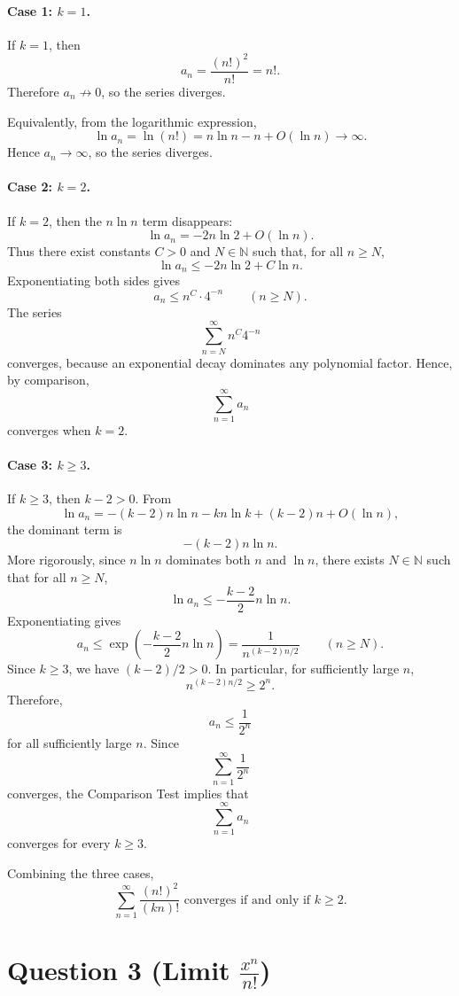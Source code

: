 \documentclass[12pt]{article}
\begin{document}
\paragraph{Case 1: \(k=1\).}
If \(k=1\), then
\[
a_n=\frac{(n!)^2}{n!}=n!.
\]
Therefore \(a_n\not\to0\), so the series diverges.

Equivalently, from the logarithmic expression,
\[
\ln a_n
=
\ln(n!)
=
n\ln n-n+O(\ln n)\to\infty.
\]
Hence \(a_n\to\infty\), so the series diverges.

\paragraph{Case 2: \(k=2\).}
If \(k=2\), then the \(n\ln n\) term disappears:
\[
\ln a_n
=
-2n\ln 2
+
O(\ln n).
\]
Thus there exist constants \(C>0\) and \(N\in\mathbb{N}\) such that, for all \(n\ge N\),
\[
\ln a_n
\le
-2n\ln2+C\ln n.
\]
Exponentiating both sides gives
\[
a_n
\le
n^C\cdot 4^{-n}
\qquad (n\ge N).
\]
The series
\[
\sum_{n=N}^{\infty} n^C4^{-n}
\]
converges, because an exponential decay dominates any polynomial factor. Hence, by comparison,
\[
\sum_{n=1}^{\infty}a_n
\]
converges when \(k=2\).

\paragraph{Case 3: \(k\ge 3\).}
If \(k\ge 3\), then \(k-2>0\). From
\[
\ln a_n
=
-(k-2)n\ln n
-
kn\ln k
+
(k-2)n
+
O(\ln n),
\]
the dominant term is
\[
-(k-2)n\ln n.
\]
More rigorously, since \(n\ln n\) dominates both \(n\) and \(\ln n\), there exists \(N\in\mathbb{N}\) such that for all \(n\ge N\),
\[
\ln a_n
\le
-\frac{k-2}{2}n\ln n.
\]
Exponentiating gives
\[
a_n
\le
\exp\left(-\frac{k-2}{2}n\ln n\right)
=
\frac{1}{n^{(k-2)n/2}}
\qquad (n\ge N).
\]
Since \(k\ge 3\), we have \((k-2)/2>0\). In particular, for sufficiently large \(n\),
\[
n^{(k-2)n/2}\ge 2^n.
\]
Therefore,
\[
a_n\le \frac1{2^n}
\]
for all sufficiently large \(n\). Since
\[
\sum_{n=1}^{\infty}\frac1{2^n}
\]
converges, the Comparison Test implies that
\[
\sum_{n=1}^{\infty}a_n
\]
converges for every \(k\ge 3\).

Combining the three cases,
\[
\boxed{\sum_{n=1}^{\infty}\frac{(n!)^2}{(kn)!}
\text{ converges if and only if }k\ge 2.}
\]

\newpage
\section*{Question 3 (Limit \(\frac{x^n}{n!}\))}
\end{document}
